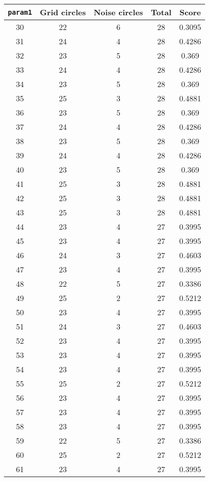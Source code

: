 \documentclass[letterpaper, 12pt]{article}
\begin{document}
\begin{longtable}{|c|c|c|c|c|}
\hline
\textbf{\texttt{param1}} & \textbf{Grid circles} & \textbf{Noise circles} & \textbf{Total} & \textbf{Score} \\
\hline
30 & 22 & 6 & 28 & 0.3095 \\
\hline
31 & 24 & 4 & 28 & 0.4286 \\
\hline
32 & 23 & 5 & 28 & 0.369 \\
\hline
33 & 24 & 4 & 28 & 0.4286 \\
\hline
34 & 23 & 5 & 28 & 0.369 \\
\hline
35 & 25 & 3 & 28 & 0.4881 \\
\hline
36 & 23 & 5 & 28 & 0.369 \\
\hline
37 & 24 & 4 & 28 & 0.4286 \\
\hline
38 & 23 & 5 & 28 & 0.369 \\
\hline
39 & 24 & 4 & 28 & 0.4286 \\
\hline
40 & 23 & 5 & 28 & 0.369 \\
\hline
41 & 25 & 3 & 28 & 0.4881 \\
\hline
42 & 25 & 3 & 28 & 0.4881 \\
\hline
43 & 25 & 3 & 28 & 0.4881 \\
\hline
44 & 23 & 4 & 27 & 0.3995 \\
\hline
45 & 23 & 4 & 27 & 0.3995 \\
\hline
46 & 24 & 3 & 27 & 0.4603 \\
\hline
47 & 23 & 4 & 27 & 0.3995 \\
\hline
48 & 22 & 5 & 27 & 0.3386 \\
\hline
49 & 25 & 2 & 27 & 0.5212 \\
\hline
50 & 23 & 4 & 27 & 0.3995 \\
\hline
51 & 24 & 3 & 27 & 0.4603 \\
\hline
52 & 23 & 4 & 27 & 0.3995 \\
\hline
53 & 23 & 4 & 27 & 0.3995 \\
\hline
54 & 23 & 4 & 27 & 0.3995 \\
\hline
55 & 25 & 2 & 27 & 0.5212 \\
\hline
56 & 23 & 4 & 27 & 0.3995 \\
\hline
57 & 23 & 4 & 27 & 0.3995 \\
\hline
58 & 23 & 4 & 27 & 0.3995 \\
\hline
59 & 22 & 5 & 27 & 0.3386 \\
\hline
60 & 25 & 2 & 27 & 0.5212 \\
\hline
61 & 23 & 4 & 27 & 0.3995 \\

\end{longtable}
\end{document}
